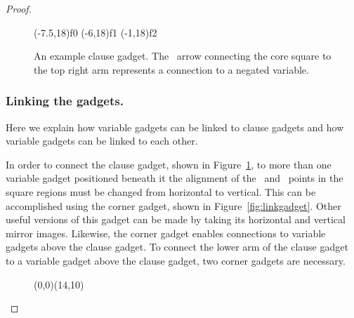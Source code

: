 \begin{proof}
\begin{figure}[h]
\begin{center}
 \pnode(-7.5,18){f0}
 \pnode(-6,18){f1}
 \pnode(-1,18){f2}




 













 



 \endpspicture
 \caption{An example clause gadget.  The \redcolour\ arrow connecting
   the core square to the top right arm represents a connection to a
   negated variable.}
\label{fig:clausegadget}
\end{center}
\end{figure}
 

\subsubsection{Linking the gadgets.}
Here we explain how variable gadgets can be linked to clause gadgets and how variable gadgets can be linked to each other.

In order to connect the clause gadget, shown in Figure~\ref{fig:clausegadget}, to more than one variable gadget positioned beneath it the alignment of the \redcolour\  and \bluecolour\ points in the square regions must be changed from  horizontal to vertical.  This can be accomplished using the corner gadget, shown in Figure~\ref{fig:linkgadget}.  Other useful versions of this gadget can be made by taking its horizontal and vertical mirror images. Likewise, the corner gadget enables connections to variable gadgets above the clause gadget.  To connect the lower arm of the clause gadget to a variable gadget above the clause gadget, two corner gadgets are necessary.

\makeatletter{}\begin{figure}[h]
\begin{center}
 \pspicture(0,0)(14,10)


\end{center}
\end{figure}
\end{proof}
